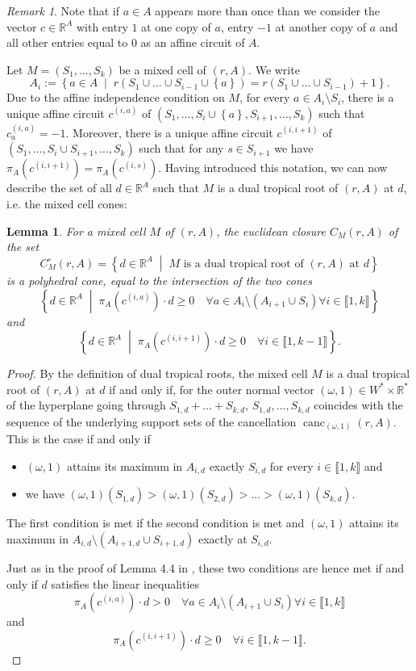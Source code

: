\documentclass[a4paper]{article}
\newtheorem{lemma}{Lemma}
\theoremstyle{remark}
\newtheorem{remark}{Remark}
\newcommand{\set}[1]{\left\{#1\right\}}
\newcommand{\setdes}[2]{\left\{#1\;\middle|\;#2\right\}}
\def\RR{\mathbb{R}}
\newcommand{\irng}[1]{\llbracket #1 \rrbracket}
\DeclareMathOperator{\canc}{canc}
\begin{document}
\begin{remark}
  Note that if $a\in A$ appears more than once than we consider the
  vector $c\in \RR^A$ with entry $1$ at one copy of $a$, entry $-1$ at
  another copy of $a$ and all other entries equal to $0$ as an affine
  circuit of $A$.
\end{remark}

Let $M = (S_1,\dots,S_k)$ be a mixed cell of $(r,A)$. We write
\[A_i:=\setdes{a\in A}{r(S_1\cup \hdots \cup S_{i-1}\cup \set{a}) = r(S_1\cup \hdots \cup S_{i-1}) + 1}.\]
 Due to the affine independence condition on $M$, for every
$a\in A_i\setminus S_i$, there is a unique affine circuit $c^{(i,a)}$ of
$(S_1,\hdots,S_i\cup \set{a},S_{i+1},\hdots,S_k)$ such that
$c^{(i,a)}_a = -1$. Moreover, there is a unique affine circuit
$c^{(i,i+1)}$ of $(S_1,\hdots,S_i\cup S_{i+1},\hdots,S_k)$ such that for
any $s\in S_{i+1}$ we have $\pi_A(c^{(i,i+1)}) = \pi_A(c^{(i,s)})$. Having
introduced this notation, we can now describe the set of all
$d\in \RR^A$ such that $M$ is a dual tropical root of $(r,A)$ at $d$, i.e.
the mixed cell cones:

\begin{lemma}
  \label{thm:mixedcone}
  For a mixed cell $M$ of $(r,A)$, the euclidean closure $C_M(r,A)$ of the set
  \[C_M^{\circ}(r,A)=\setdes{d\in \RR^A}{M\text{ is a dual tropical root of }(r,A)\text{ at }d}\]
  is a polyhedral cone, equal to the intersection of the two cones
  \[\setdes{d\in \RR^A}{\pi_A(c^{(i,a)})\cdot d \geq 0 \quad \forall a \in A_i\setminus (A_{i+1}\cup S_i)\forall i\in \irng{1,k}}\]
  and
  \[\setdes{d\in \RR^A}{\pi_A(c^{(i,i+1)})\cdot d \geq 0 \quad \forall i\in \irng{1,k-1}}.\]
\end{lemma}
\begin{proof}
  By the definition of dual tropical roots, the mixed cell $M$ is a
  dual tropical root of $(r,A)$ at $d$ if and only if, for the outer
  normal vector $(\omega,1)\in W^{*}\times \RR^{*}$ of the hyperplane going
  through $S_{1,d}+\hdots +S_{k,d}$, $S_{1,d},\hdots,S_{k,d}$
  coincides with the sequence of the underlying support sets of the
  cancellation $\canc_{(\omega,1)}(r,A)$. This is the case if and only if
  \begin{itemize}
  \item $(\omega,1)$ attains its maximum in $A_{i,d}$ exactly $S_{i,d}$ for every $i\in \irng{1,k}$ and
  \item we have $(\omega,1)(S_{1,d}) > (\omega,1)(S_{2,d}) > \hdots > (\omega,1)(S_{k,d})$.
  \end{itemize}
  The first condition is met if the second condition is met and
  $(\omega,1)$ attains its maximum in $A_{i,d}\setminus (A_{i+1,d}\cup S_{i+1,d})$
  exactly at $S_{i,d}$.

  Just as in the proof of Lemma 4.4 in
  \cite{jensenTropicalHomotopyContinuation2016}, these two conditions are hence met
  if and only if $d$ satisfies the linear inequalities
  \[\pi_A(c^{(i,a)})\cdot d > 0\quad \forall a \in A_i\setminus (A_{i+1}\cup S_i)\forall i\in \irng{1,k}\]
  and
  \[\pi_A(c^{(i,i+1)})\cdot d \geq 0 \quad \forall i\in \irng{1,k-1}.\]
\end{proof}
\end{document}
